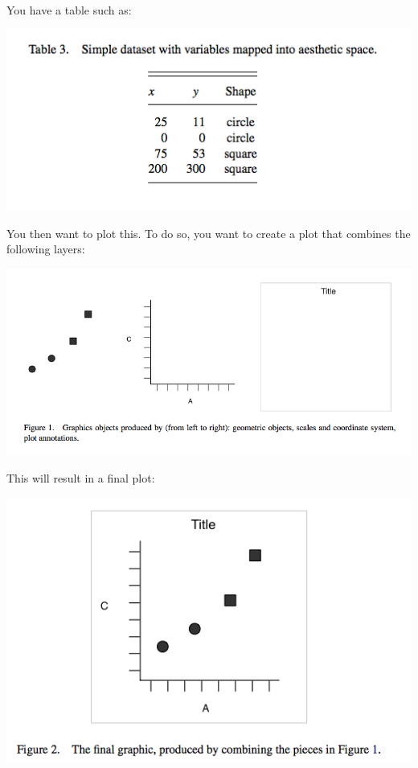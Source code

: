 \documentclass[]{book}
\theoremstyle{definition}
\theoremstyle{definition}
\theoremstyle{definition}
\theoremstyle{remark}
\begin{document}
You have a table such as:

\includegraphics{imgs/table.png}

You then want to plot this. To do so, you want to create a plot that
combines the following layers:

\includegraphics{imgs/layers.png}

This will result in a final plot:

\includegraphics{imgs/combined.png}
\end{document}
